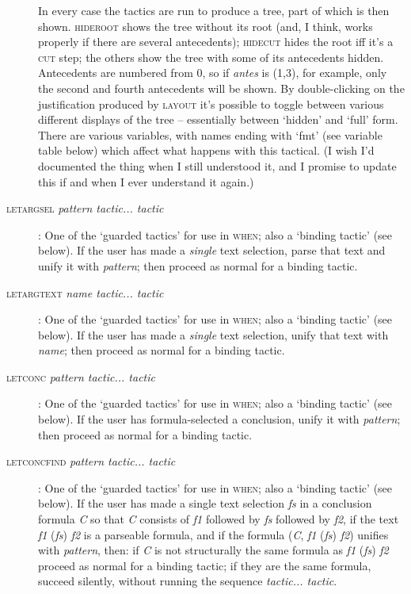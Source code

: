 \begin{description}
In every case the tactics are run to produce a tree, part of which is then shown. \textsc{hideroot} shows the tree without its root (and, I think, works properly if there are several antecedents); \textsc{hidecut} hides the root iff it's a \textsc{cut} step; the others show the tree with some of its antecedents hidden. Antecedents are numbered from 0, so if \textit{antes} is (1,3), for example, only the second and fourth antecedents will be shown. By double-clicking on the justification produced by \textsc{layout} it's possible to toggle between various different displays of the tree -- essentially between `hidden' and `full' form. There are various variables, with names ending with `fmt' (see variable table below) which affect what happens with this tactical. (I wish I'd documented the thing when I still understood it, and I promise to update this if and when I ever understand it again.)

\item [\textsc{letargsel} \textit{pattern tactic... tactic}]: One of the `guarded tactics' for use in \textsc{when}; also a `binding tactic' (see below). If the user has made a \textit{single} text selection, parse that text and unify it with \textit{pattern}; then proceed as normal for a binding tactic.
\item [\textsc{letargtext} \textit{name tactic... tactic}]: One of the `guarded tactics' for use in \textsc{when}; also a `binding tactic' (see below). If the user has made a \textit{single} text selection, unify that text with \textit{name}; then proceed as normal for a binding tactic.

\item [\textsc{letconc} \textit{pattern tactic... tactic}]: One of the `guarded tactics' for use in \textsc{when}; also a `binding tactic' (see below). If the user has formula-selected a conclusion, unify it with \textit{pattern}; then proceed as normal for a binding tactic.

\item [\textsc{letconcfind} \textit{pattern tactic... tactic}]: One of the `guarded tactics' for use in \textsc{when}; also a `binding tactic' (see below). If the user has made a single text selection \textit{fs} in a conclusion formula \textit{C} so that \textit{C} consists of \textit{f1} followed by \textit{fs} followed by \textit{f2}, if the text \textit{f1} (\textit{fs}) \textit{f2} is a parseable formula, and if the formula (\textit{C}, \textit{f1} (\textit{fs}) \textit{f2}) unifies with \textit{pattern}, then: if \textit{C} is not structurally the same formula as \textit{f1} (\textit{fs}) \textit{f2} proceed as normal for a binding tactic; if they are the same formula, succeed silently, without running the sequence \textit{tactic... tactic}.



\end{description}
